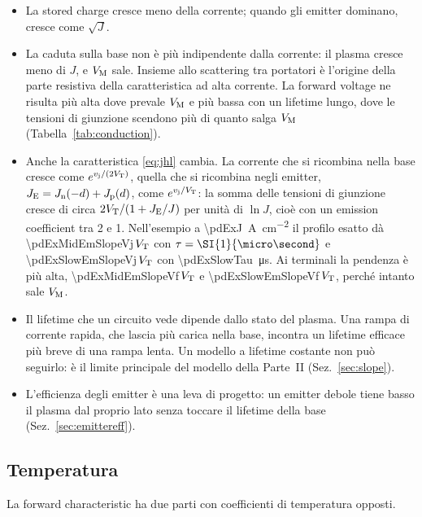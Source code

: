\documentclass[10pt,a4paper]{scrartcl}
\let\newcommand\pdvaluedefine
\newcommand{\vj}{v_\mathrm{j}}
\newcommand{\VT}{V_\mathrm{T}}
\newcommand{\Jn}{J_\mathrm{n}}
\newcommand{\Jp}{J_\mathrm{p}}
\newcommand{\VM}{V_\mathrm{M}}
\begin{document}
\begin{itemize}
\item La stored charge cresce meno della corrente; quando gli emitter dominano, cresce come $\sqrt{J}$.
\item La caduta sulla base non è più indipendente dalla corrente: il plasma cresce meno di $J$, e $\VM$ sale. Insieme allo scattering tra portatori è l'origine della parte resistiva della caratteristica ad alta corrente. La forward voltage ne risulta più alta dove prevale $\VM$ e più bassa con un lifetime lungo, dove le tensioni di giunzione scendono più di quanto salga $\VM$ (Tabella~\ref{tab:conduction}).
\item Anche la caratteristica \eqref{eq:jhl} cambia. La corrente che si ricombina nella base cresce come $e^{\vj/(2\VT)}$, quella che si ricombina negli emitter, $J_\mathrm{E} = \Jn(-d) + \Jp(d)$, come $e^{\vj/\VT}$: la somma delle tensioni di giunzione cresce di circa $2\VT/(1 + J_\mathrm{E}/J)$ per unità di $\ln J$, cioè con un emission coefficient tra 2 e 1. Nell'esempio a \SI{\pdExJ}{\ampere\per\centi\metre\squared} il profilo esatto dà \num{\pdExMidEmSlopeVj}\,$\VT$ con $\tau = \SI{\pdExMidTau}{\micro\second}$ e \num{\pdExSlowEmSlopeVj}\,$\VT$ con \SI{\pdExSlowTau}{\micro\second}. Ai terminali la pendenza è più alta, \num{\pdExMidEmSlopeVf}\,$\VT$ e \num{\pdExSlowEmSlopeVf}\,$\VT$, perché intanto sale $\VM$.
\item Il lifetime che un circuito vede dipende dallo stato del plasma. Una rampa di corrente rapida, che lascia più carica nella base, incontra un lifetime efficace più breve di una rampa lenta. Un modello a lifetime costante non può seguirlo: è il limite principale del modello della Parte~II (Sez.~\ref{sec:slope}).
\item L'efficienza degli emitter è una leva di progetto: un emitter debole tiene basso il plasma dal proprio lato senza toccare il lifetime della base (Sez.~\ref{sec:emittereff}).
\end{itemize}

\subsection{Temperatura}
\label{sec:temperature}
La forward characteristic ha due parti con coefficienti di temperatura opposti.
\end{document}
